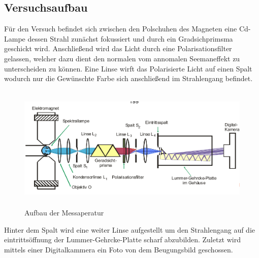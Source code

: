 \subsection{Versuchsaufbau}
Für den Versuch befindet sich zwischen den Polschuhen des Magneten eine Cd-Lampe dessen Strahl zunächst fokussiert und durch ein Gradsichprimsma geschickt wird. Anschließend wird das Licht durch eine Polarisationsfilter gelassen, welcher dazu dient den normalen vom annomalen Seemaneffekt zu unterscheiden zu können. Eine Linse wirft das Polarisierte Licht auf einen Spalt wodurch nur die Gewünschte Farbe sich anschließend im Strahlengang befindet. 
\begin{figure}[H]
  \centering
  \includegraphics[height=6cm]{Bilder/Aufbau.png}
  \caption{Aufbau der Messaperatur}
  \label{fig:<+label+>}
\end{figure}
Hinter dem Spalt wird eine weiter Linse aufgestellt um den Strahlengang auf die eintrittsöffnung der Lummer-Gehrcke-Platte scharf abzubilden. Zuletzt wird mittels einer Digitalkammera ein Foto von dem Beugungsbild geschossen.
